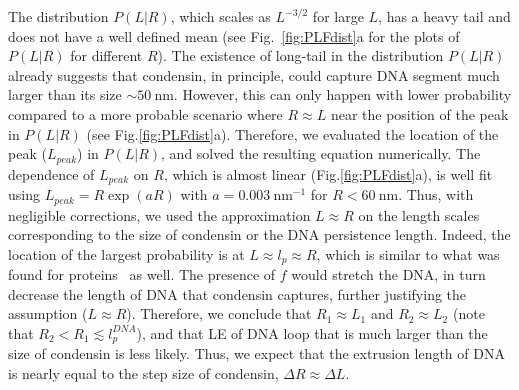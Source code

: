 \documentclass[fleqn,10pt]{wlscirep}
\newcommand{\nm}{\ \mathrm{nm}}
\newcommand{\vR}{R}
\newcommand{\vL}{L}
\newcommand{\DR}{\Delta {R}}
\newcommand{\Dl}{\Delta {L}}
\begin{document}
The distribution $P(\vL|\vR)$, which scales as $\vL^{-3/2}$ for large $\vL$, has a heavy tail and does not have a well defined mean (see Fig.~\ref{fig:PLFdist}a for the plots of $P(\vL|\vR)$ for different $\vR$). The existence of long-tail in the distribution $P(\vL|\vR)$ already suggests that condensin, in principle, could capture DNA segment much larger than its size $\sim 50\nm$. However, this can only happen with lower probability compared to a more probable scenario where $\vR \approx \vL$ near the position of the peak in $P(\vL|\vR)$ (see Fig.\ref{fig:PLFdist}a). Therefore, we evaluated the location of the peak ($\vL_{peak}$)  in $P(\vL|\vR)$, and solved the resulting equation numerically. The dependence of $\vL_{peak}$ on $\vR$, which is almost linear (Fig.\ref{fig:PLFdist}a),  is well fit using $\vL_{peak}=\vR\exp(a\vR)$ with $a=0.003\ \mathrm{nm}^{-1}$ for $\vR < 60\nm$. Thus, with negligible corrections, we used the approximation $\vL \approx \vR$ on the length scales corresponding to the size of condensin or the DNA persistence length. 
Indeed, the location of the largest probability is at  $\vL\approx l_p \approx \vR$, which is similar to what was found for proteins~\cite{thirumalai1999time} as well. 
The presence of $f$ would stretch the DNA, in turn decrease the length of DNA that condensin captures, further justifying the assumption ($\vL\approx \vR$).  Therefore, we conclude that $R_1 \approx L_1$ and $R_2\approx L_2$ (note that $R_2 < R_1 \lesssim l^{DNA}_p$), and that LE of  DNA loop that is much larger than the size of condensin is less likely. 
Thus, we expect that the  extrusion length of DNA is nearly equal to the step size of condensin, $\DR \approx \Dl$.  




\end{document}
